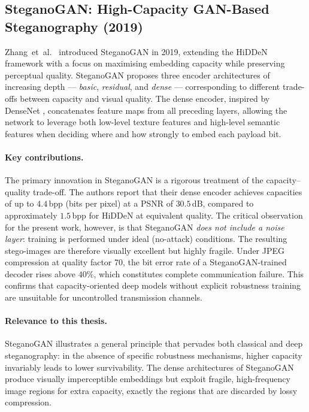 \documentclass[12pt,a4paper,oneside]{report}
\begin{document}
	\subsection{SteganoGAN: High-Capacity GAN-Based Steganography (2019)}
	\label{subsec:steganogan}
	
	Zhang~et~al.\ \cite{zhang2019steganogan} introduced SteganoGAN in 2019, extending the
	HiDDeN framework with a focus on maximising embedding capacity while preserving perceptual
	quality. SteganoGAN proposes three encoder architectures of increasing depth — \emph{basic},
	\emph{residual}, and \emph{dense} — corresponding to different trade-offs between capacity and
	visual quality. The dense encoder, inspired by DenseNet \cite{huang2017densely}, concatenates
	feature maps from all preceding layers, allowing the network to leverage both low-level texture
	features and high-level semantic features when deciding where and how strongly to embed each
	payload bit.
	
	\paragraph{Key contributions.}
	The primary innovation in SteganoGAN is a rigorous treatment of the capacity--quality trade-off.
	The authors report that their dense encoder achieves capacities of up to $4.4$\,bpp (bits per
	pixel) at a PSNR of $30.5$\,dB, compared to approximately $1.5$\,bpp for HiDDeN at equivalent
	quality. The critical observation for the present work, however, is that SteganoGAN \emph{does
		not include a noise layer}: training is performed under ideal (no-attack) conditions. The
	resulting stego-images are therefore visually excellent but highly fragile. Under JPEG compression
	at quality factor 70, the bit error rate of a SteganoGAN-trained decoder rises above $40\%$, which
	constitutes complete communication failure. This confirms that capacity-oriented deep models
	without explicit robustness training are unsuitable for uncontrolled transmission channels.
	
	\paragraph{Relevance to this thesis.}
	SteganoGAN illustrates a general principle that pervades both classical and deep steganography: in
	the absence of specific robustness mechanisms, higher capacity invariably leads to lower
	survivability. The dense architectures of SteganoGAN produce visually imperceptible embeddings but
	exploit fragile, high-frequency image regions for extra capacity, exactly the regions that are
	discarded by lossy compression.
	
\end{document}

